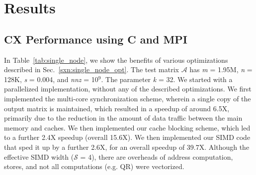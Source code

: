 \section{Results}
\label{sec:results}



\subsection{CX Performance using C and MPI} %
  \label{sxn:results1}


   

      In Table~\ref{tab:single_node}, we show the benefits of various
      optimizations described in
      Sec.~\ref{sxn:single_node_opt}. 
      The test matrix $\mathcal{A}$ has {\it{m}} = 1.95M, {\it{n}} = 128K,
      {\it{s}} = 0.004, and {\it{nnz}} = 10$^9$. The parameter
      {\it{k}} = 32. We started with a parallelized implementation,
      without any of the described optimizations. %
      We first implemented the multi-core synchronization scheme, wherein a single copy of the
      output matrix is maintained, %
      which resulted in a speedup of around 6.5X, primarily due to
      the reduction in the amount of data traffic between the main
      memory and caches. 
      We then implemented our cache blocking scheme, which led to a
      further  2.4X speedup (overall 15.6X).
      We then implemented our SIMD code that sped it up by a further
      2.6X, for an overall speedup of 39.7X. Although the effective SIMD width
        ($\mathcal{S}$ = 4), there are overheads of address
        computation, stores, and not all computations (e.g. QR) were
        vectorized.



